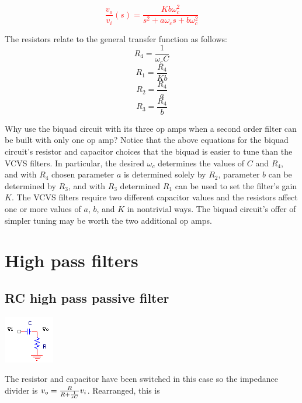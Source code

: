 \textcolor{red}{
\begin{equation}
\frac{v_{o}}{v_{i}}(s) = \frac{Kb\omega_{c}^{2}}{s^{2} + a\omega_{c}s + b\omega_{c}^{2}}
\label{eq:2ndorderbiquadLPfilter}
\end{equation}
}

The resistors relate to the general transfer function as follows:
\begin{equation}
R_4 = \frac{1}{\omega_{c}C}
\end{equation}
\begin{equation}
R_1 = \frac{R_4}{Kb}
\end{equation}
\begin{equation}
R_2 = \frac{R_4}{a}
\end{equation}
\begin{equation}
R_3 = \frac{R_4}{b}
\end{equation}

Why use the biquad circuit with its three op amps when a second order filter can be built with only one op amp?
Notice that the above equations for the biquad circuit's resistor and capacitor choices that the biquad is easier to tune than the VCVS filters.
In particular, the desired $\omega_{c}$ determines the values of $C$ and $R_4$, and with $R_4$ chosen parameter $a$ is determined solely by $R_2$, parameter $b$ can be determined by $R_3$, and with $R_3$ determined $R_1$ can be used to set the filter's gain $K$.
The VCVS filters require two different capacitor values and the resistors affect one or more values of $a$, $b$, and $K$ in nontrivial ways.
The biquad circuit's offer of simpler tuning may be worth the two additional op amps. \autocite[120-122]{op-amp-circuits-johnson}

\section{High pass filters}

\subsection{RC high pass passive filter}
\begin{center}
	\includegraphics{schematics/rcHPfilter.PNG}
\end{center}
The resistor and capacitor have been switched in this case so the impedance divider is $v_o = \frac{R}{R+\frac{1}{sC}}v_i$. Rearranged, this is

